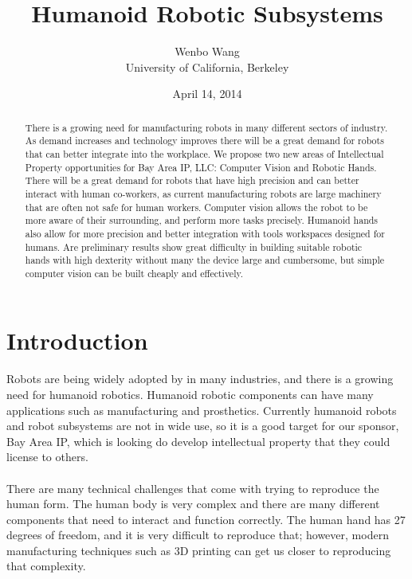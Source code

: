 \documentclass[letterpaper]{article}
\title{Humanoid Robotic Subsystems}
\date{April 14, 2014}
\author{Wenbo Wang \\University of California, Berkeley}
\begin{document}
\maketitle

\begin{abstract}
There is a growing need for manufacturing robots in many different sectors of
industry. As demand increases and technology improves there will be a great
demand for robots that can better integrate into the workplace. We propose two
new areas of Intellectual Property opportunities for Bay Area IP, LLC: Computer
Vision and Robotic Hands. There will be a great demand for robots that have high
precision and can better interact with human co-workers, as current
manufacturing robots are large machinery that are often not safe for human
workers. Computer vision allows the robot to be more aware of their surrounding,
and perform more tasks precisely. Humanoid hands also allow for more precision
and better integration with tools workspaces designed for humans. Are
preliminary results show great difficulty in building suitable robotic hands
with high dexterity without many the device large and cumbersome, but simple
computer vision can be built cheaply and effectively.  
\end{abstract}

\section{Introduction}
\paragraph{}Robots are being widely adopted by in many industries, and there is
a growing need for humanoid robotics. Humanoid robotic components can have many
applications such as manufacturing and prosthetics. Currently humanoid robots
and robot subsystems are not in wide use, so it is a good target for our
sponsor, Bay Area IP, which is looking do develop intellectual property that
they could license to others.

\paragraph{}There are many technical challenges that come with trying to
reproduce the human form. The human body is very complex and there are many
different components that need to interact and function correctly. The human
hand has 27 degrees of freedom, and it is very difficult to reproduce that;
however, modern manufacturing techniques such as 3D printing can get us closer
to reproducing that complexity. 
\end{document}
